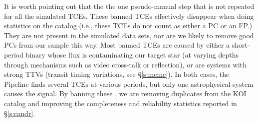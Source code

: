 It is worth pointing out that the  the one pseudo-manual step that is not repeated for all the simulated TCEs.  These banned TCEs effectively disappear when doing statistics on the catalog (i.e., these TCEs do not count as either a PC or an FP.) They are not present in the simulated data sets, nor are we likely to remove good PCs from our sample this way. Most banned TCEs are caused by either a short-period binary whose flux is contaminating our target star (at varying depths through mechanisms such as video cross-talk or reflection), or are systems with strong TTVs (transit timing variations, see \S\ref{s:mcmc}). In both cases, the Pipeline finds several TCEs at various periods, but only one astrophysical system causes the signal.  By banning these \opstces, we are removing duplicates from the KOI catalog and improving the completeness and reliability statistics reported in \S\ref{s:candr}.
